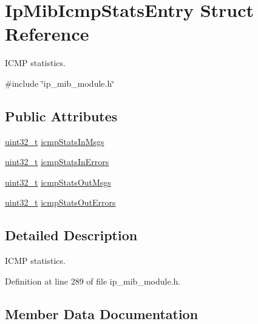 \hypertarget{structIpMibIcmpStatsEntry}{}\section{Ip\+Mib\+Icmp\+Stats\+Entry Struct Reference}
\label{structIpMibIcmpStatsEntry}


I\+C\+MP statistics.  




{\ttfamily \#include \char`\"{}ip\+\_\+mib\+\_\+module.\+h\char`\"{}}

\subsection*{Public Attributes}
\begin{DoxyCompactItemize}
\item 
\hyperlink{stdint_8h_a435d1572bf3f880d55459d9805097f62}{uint32\+\_\+t} \hyperlink{structIpMibIcmpStatsEntry_a5f07890e7a7125c829d9e7a91ab2a70e}{icmp\+Stats\+In\+Msgs}
\item 
\hyperlink{stdint_8h_a435d1572bf3f880d55459d9805097f62}{uint32\+\_\+t} \hyperlink{structIpMibIcmpStatsEntry_a85675662f0c490facdbcce7d33979ceb}{icmp\+Stats\+In\+Errors}
\item 
\hyperlink{stdint_8h_a435d1572bf3f880d55459d9805097f62}{uint32\+\_\+t} \hyperlink{structIpMibIcmpStatsEntry_aa46dbfd8624afae0ec341fed13002cc9}{icmp\+Stats\+Out\+Msgs}
\item 
\hyperlink{stdint_8h_a435d1572bf3f880d55459d9805097f62}{uint32\+\_\+t} \hyperlink{structIpMibIcmpStatsEntry_a1d2598af0d46a482abd246e40ea16195}{icmp\+Stats\+Out\+Errors}
\end{DoxyCompactItemize}


\subsection{Detailed Description}
I\+C\+MP statistics. 

Definition at line 289 of file ip\+\_\+mib\+\_\+module.\+h.



\subsection{Member Data Documentation}
\mbox{\label{structIpMibIcmpStatsEntry_a85675662f0c490facdbcce7d33979ceb}} 
